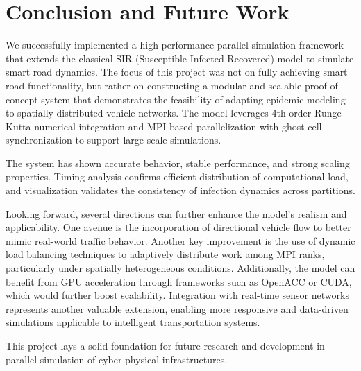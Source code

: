 \section{Conclusion and Future Work}


We successfully implemented a high-performance parallel simulation framework that extends the classical SIR (Susceptible-Infected-Recovered) model to simulate smart road dynamics. The focus of this project was not on fully achieving smart road functionality, but rather on constructing a modular and scalable proof-of-concept system that demonstrates the feasibility of adapting epidemic modeling to spatially distributed vehicle networks. The model leverages 4th-order Runge-Kutta numerical integration and MPI-based parallelization with ghost cell synchronization to support large-scale simulations.

The system has shown accurate behavior, stable performance, and strong scaling properties. Timing analysis confirms efficient distribution of computational load, and visualization validates the consistency of infection dynamics across partitions.

Looking forward, several directions can further enhance the model’s realism and applicability. One avenue is the incorporation of directional vehicle flow to better mimic real-world traffic behavior. Another key improvement is the use of dynamic load balancing techniques to adaptively distribute work among MPI ranks, particularly under spatially heterogeneous conditions. Additionally, the model can benefit from GPU acceleration through frameworks such as OpenACC or CUDA, which would further boost scalability. Integration with real-time sensor networks represents another valuable extension, enabling more responsive and data-driven simulations applicable to intelligent transportation systems.

This project lays a solid foundation for future research and development in parallel simulation of cyber-physical infrastructures.


